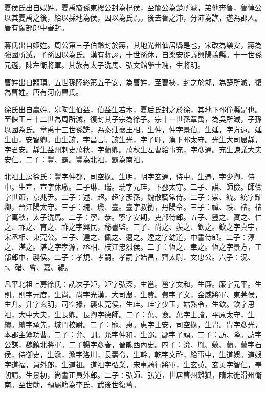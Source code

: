 \begin{pinyinscope}
 夏侯氏出自姒姓。夏禹裔孫東樓公封為杞侯，至簡公為楚所滅，弟他奔魯，魯悼公以其夏禹之後，給以採地為侯，因以為氏焉。後去魯之沛，分沛為譙，遂為郡人。唐有駕部郎中審封。



 蔣氏出自姬姓。周公第三子伯齡封於蔣，其地光州仙居縣是也，宋改為樂安，蔣為強國所滅，子孫因以為氏。漢有蔣詡，十世孫休，自樂安徙議興陽羨縣。十一世孫元遜，陳左衛將軍。其族有太子洗馬、弘文館學士瑰，生將明。



 曹姓出自顓頊。五世孫陸終第五子安，為曹姓，至曹挾，封之於邾，為楚所滅，復為曹姓。唐有河南曹氏。



 徐氏出自贏姓。皋陶生伯益，伯益生若木，夏后氏封之於徐，其地下邳僮縣是也。至偃王三十二世為周所滅，復封其子宗為徐子。宗十一世孫章禹，為吳所滅，子孫以國為氏。章禹十三世孫詵，為秦莊襄王相。生仲，仲字景伯。生延，字方遠。延生由，安智卿。由生該，字昌言。該生光，字子暉，漢下邳太守。光生大司農靜，字君安。靜生益州刺史萬秋，字蘭卿。萬秋生左曹給事充，字彥通。充生諫議大夫安仁。二子：豐、霸。豐為北祖，霸為南祖。



 北祖上房徐氏：豐字仲都，司空掾。生明，明字玄通，侍中。生遷，字少卿，侍中。生宣，宣字休璥。二子琳、瑞。瑞字元珪，下邳太守。二子、謨、師儉。師儉字世節，京兆尹。二子：述、超。超字彥孫，魏散騎常侍。二子：崇、統。統字耀卿，晉江陽太守。三子：瑰、璣、臺。臺字叔衡，丹陽令。三子：禕、祑、禇。禇字萬秋，太子洗馬。二子：寧、恭。寧字安期，吏部侍郎。五子、豐之、實之、仁之、祚之、育之、祚之字興民，秘書監。三子、尚之、羨之、欽之。欽之字真宇，宋丞相、東莞公。三子、達之、佩之、邁之。逵之字幼道，中書侍郎。二子：淳之、湛之。湛之字孝源，丞相、枝江忠烈侯。二子：恆之、聿之。恆之字景方，工部郎中，襲侯。二子：孝規、孝嗣。孝嗣字始昌，齊太尉、文忠公。六子：況、ρ、碏、會、嘉、緄。



 凡平北祖上房徐氏：詵次子矩，矩字弘深，生邕。邕字文和，生廉。廉字元平。生則。則字元度，生尚。尚字光漢，大司農，生費。費字子文，金威將軍、東莞侯，生升。升字玄明，司空掾，襲東莞侯，生珪。珪字少玉，姑熟令，生欽。欽字思祖，大中大夫，生長卿。長卿字德師。二子：萬、僉。萬字士諧，平原太守，生續。續字承先，城門校尉。二子：寵、惠。惠字士安，司空掾，生胄。胄字彥光，本郡主簿功曹。二子：允、訓。允字仲和，生鄙。鄙字子頑。二子：訪、隆。訪字公謀，魏鎮北將軍。二子暢字彥春，晉隴西內史。四子：沇、胤、敷、蘭。蘭字石侯，侍御史，生澹，澹字洛川，長壽令，生幹。乾字文祚，給事中，生道娛。道娛字道福，員外郎，生道祖。道祖字弘業，宋車騎行將軍，生玄英。玄英字智仁，奉朝請。生景初，尚書正員外郎。二子：弘師、弘道，世居曹州離狐，隋末徙滑州衛南。至世勣，預屬籍為李氏，武後世復舊。




\end{pinyinscope}
